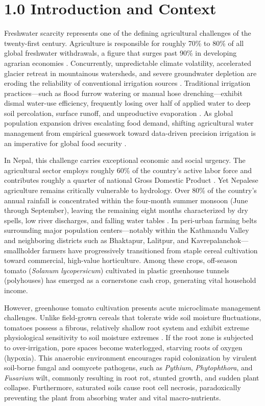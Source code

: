 \documentclass[12pt, a4paper]{article}
\begin{document}
\tableofcontents
\newpage
\listoffigures
\listoftables
\newpage
{}

\section{1.0 Introduction and Context}
\label{sec:intro}

Freshwater scarcity represents one of the defining agricultural challenges of the twenty-first century. Agriculture is responsible for roughly 70\% to 80\% of all global freshwater withdrawals, a figure that surges past 90\% in developing agrarian economies \citep{almulla2022,liu2023}. Concurrently, unpredictable climate volatility, accelerated glacier retreat in mountainous watersheds, and severe groundwater depletion are eroding the reliability of conventional irrigation sources \citep{mool2001}. Traditional irrigation practices—such as flood furrow watering or manual hose drenching—exhibit dismal water-use efficiency, frequently losing over half of applied water to deep soil percolation, surface runoff, and unproductive evaporation \citep{naji2021}. As global population expansion drives escalating food demand, shifting agricultural water management from empirical guesswork toward data-driven precision irrigation is an imperative for global food security \citep{singha2025}.

In Nepal, this challenge carries exceptional economic and social urgency. The agricultural sector employs roughly 60\% of the country's active labor force and contributes roughly a quarter of national Gross Domestic Product \citep{kunwar2024}. Yet Nepalese agriculture remains critically vulnerable to hydrology. Over 80\% of the country's annual rainfall is concentrated within the four-month summer monsoon (June through September), leaving the remaining eight months characterized by dry spells, low river discharges, and falling water tables \citep{upadhyay2015}. In peri-urban farming belts surrounding major population centers—notably within the Kathmandu Valley and neighboring districts such as Bhaktapur, Lalitpur, and Kavrepalanchok—smallholder farmers have progressively transitioned from staple cereal cultivation toward commercial, high-value horticulture. Among these crops, off-season tomato (\emph{Solanum lycopersicum}) cultivated in plastic greenhouse tunnels (polyhouses) has emerged as a cornerstone cash crop, generating vital household income.

However, greenhouse tomato cultivation presents acute microclimate management challenges. Unlike field-grown cereals that tolerate wide soil moisture fluctuations, tomatoes possess a fibrous, relatively shallow root system and exhibit extreme physiological sensitivity to soil moisture extremes \citep{allen1998}. If the root zone is subjected to over-irrigation, pore spaces become waterlogged, starving roots of oxygen (hypoxia). This anaerobic environment encourages rapid colonization by virulent soil-borne fungal and oomycete pathogens, such as \emph{Pythium}, \emph{Phytophthora}, and \emph{Fusarium} wilt, commonly resulting in root rot, stunted growth, and sudden plant collapse. Furthermore, saturated soils cause root cell necrosis, paradoxically preventing the plant from absorbing water and vital macro-nutrients.
\end{document}
